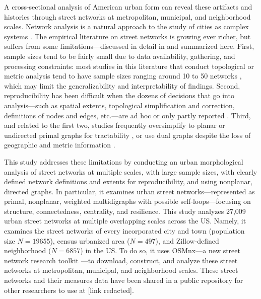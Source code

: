 \documentclass{article}
\begin{document}
A cross-sectional analysis of American urban form can reveal these artifacts and histories through street networks at metropolitan, municipal, and neighborhood scales. Network analysis is a natural approach to the study of cities as complex systems \cite{masucci_random_2009}. The empirical literature on street networks is growing ever richer, but suffers from some limitations---discussed in detail in \cite{boeing_osmnx:_2017} and summarized here. First, sample sizes tend to be fairly small due to data availability, gathering, and processing constraints: most studies in this literature that conduct topological or metric analysis tend to have sample sizes ranging around 10 to 50 networks \cite{buhl_topological_2006, cardillo_structural_2006, barthelemy_modeling_2008, strano_urban_2013}, which may limit the generalizability and interpretability of findings. Second, reproducibility has been difficult when the dozens of decisions that go into analysis---such as spatial extents, topological simplification and correction, definitions of nodes and edges, etc.---are ad hoc or only partly reported \citep[e.g.,][]{porta_network_2006, strano_urban_2013}. Third, and related to the first two, studies frequently oversimplify to planar or undirected primal graphs for tractability \cite[e.g.,][]{buhl_topological_2006, cardillo_structural_2006, barthelemy_modeling_2008, masucci_random_2009}, or use dual graphs despite the loss of geographic and metric information \cite{batty_network_2005, jiang_integration_2002, ratti_space_2004, crucitti_centrality_2006, crucitti_centrality_2006-1}. 

This study addresses these limitations by conducting an urban morphological analysis of street networks at multiple scales, with large sample sizes, with clearly defined network definitions and extents for reproducibility, and using nonplanar, directed graphs. In particular, it examines urban street networks---represented as primal, nonplanar, weighted multidigraphs with possible self-loops---focusing on structure, connectedness, centrality, and resilience. This study analyzes 27,009 urban street networks at multiple overlapping scales across the US. Namely, it examines the street networks of every incorporated city and town (population size $N=19655$), census urbanized area ($N=497$), and Zillow-defined neighborhood ($N=6857$) in the US. To do so, it uses OSMnx---a new street network research toolkit \cite{boeing_osmnx:_2017}---to download, construct, and analyze these street networks at metropolitan, municipal, and neighborhood scales. These street networks and their measures data have been shared in a public repository for other researchers to use at [link redacted].
\end{document}
